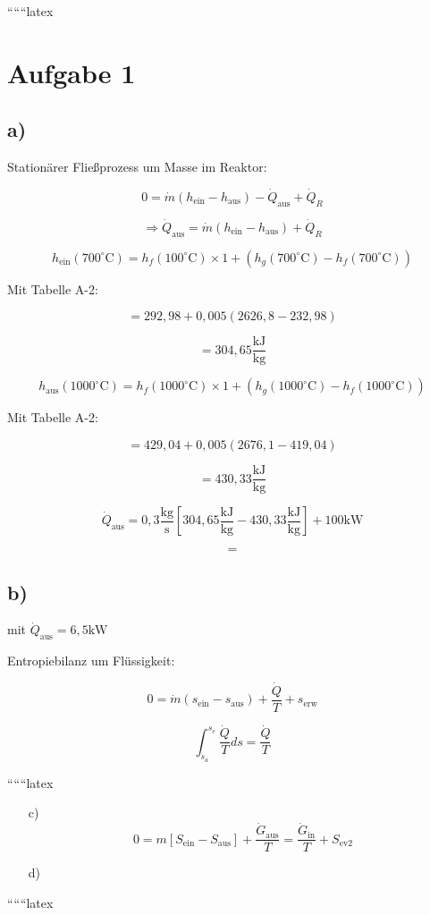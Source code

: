 
``````latex


\section*{Aufgabe 1}

\subsection*{a)}
Stationärer Fließprozess um Masse im Reaktor:

\[
0 = \dot{m} (h_{\text{ein}} - h_{\text{aus}}) - \dot{Q}_{\text{aus}} + \dot{Q}_R
\]

\[
\Rightarrow \dot{Q}_{\text{aus}} = \dot{m} (h_{\text{ein}} - h_{\text{aus}}) + \dot{Q}_R
\]

\[
h_{\text{ein}} (700^\circ \text{C}) = h_f (100^\circ \text{C}) \times 1 + (h_g (700^\circ \text{C}) - h_f (700^\circ \text{C}))
\]

Mit Tabelle A-2:

\[
= 292,98 + 0,005 (2626,8 - 232,98)
\]

\[
= 304,65 \frac{\text{kJ}}{\text{kg}}
\]

\[
h_{\text{aus}} (1000^\circ \text{C}) = h_f (1000^\circ \text{C}) \times 1 + (h_g (1000^\circ \text{C}) - h_f (1000^\circ \text{C}))
\]

Mit Tabelle A-2:

\[
= 429,04 + 0,005 (2676,1 - 419,04)
\]

\[
= 430,33 \frac{\text{kJ}}{\text{kg}}
\]

\[
\dot{Q}_{\text{aus}} = 0,3 \frac{\text{kg}}{\text{s}} \left[ 304,65 \frac{\text{kJ}}{\text{kg}} - 430,33 \frac{\text{kJ}}{\text{kg}} \right] + 100 \text{kW}
\]

\[
=
\]

\subsection*{b)}
mit \(\dot{Q}_{\text{aus}} = 6,5 \text{kW}\)

Entropiebilanz um Flüssigkeit:

\[
0 = \dot{m} (s_{\text{ein}} - s_{\text{aus}}) + \frac{\dot{Q}}{T} + s_{\text{erw}}
\]

\[
\int_{s_a}^{s_e} \frac{\dot{Q}}{T} ds = \frac{\dot{Q}}{T}
\]

``````latex


\begin{itemize}
    \item[c)] \[ 0 = m \left[ S_{\text{ein}} - S_{\text{aus}} \right] + \frac{\dot{G}_{\text{aus}}}{T} = \frac{\dot{G}_{\text{in}}}{T} + S_{\text{ev2}} \]
    \item[d)] 
\end{itemize}

``````latex


